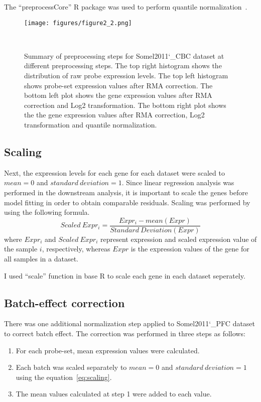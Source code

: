 The ``preprocessCore'' R package was used to perform quantile normalization~\cite{Bolstad2021}.

\begin{figure}[h]
\centering
\texttt{[image: figures/figure2\_2.png]}
\caption{Summary of preprocessing steps for Somel2011\char`_CBC dataset at different preprocessing steps. 
The top right histogram shows the distribution of raw probe expression levels. 
The top left histogram shows probe-set expression values after RMA correction. 
The bottom left plot shows the gene expression values after RMA correction and Log2 transformation.
The bottom right plot shows the the gene expression values after RMA correction, Log2 transformation and quantile normalization.}~\label{fig:fig2.2}
\end{figure}

\subsection{Scaling}
Next, the expression levels for each gene for each dataset were scaled to $mean=0$ and $standard\ deviation=1$. 
Since linear regression analysis was performed in the downstream analysis, 
it is important to scale the genes before model fitting in order to obtain comparable residuals.
Scaling was performed by using the following formula.
\begin{equation}
    Scaled\ Expr_i = \frac{Expr_i - mean(Expr)}{Standard\ Deviation(Expr)}
    \label{eq:scaling}
\end{equation}
where $Expr_i$ and $Scaled\ Expr_i$ represent expression and scaled expression value of the sample $i$, respectively, 
whereas $Expr$ is the expression values of the gene for all samples in a dataset.

I used ``scale'' function in base R to scale each gene in each dataset seperately.

\subsection{Batch-effect correction}
There was one additional normalization step applied to Somel2011\char`_PFC dataset to correct batch effect.
The correction was performed in three steps as follows:

\begin{enumerate}
    \item For each probe-set, mean expression values were calculated.
    \item Each batch was scaled separately to $mean=0$ and $standard\ deviation=1$ using the equation~\ref{eq:scaling}.
    \item The mean values calculated at step 1 were added to each value.
\end{enumerate}



